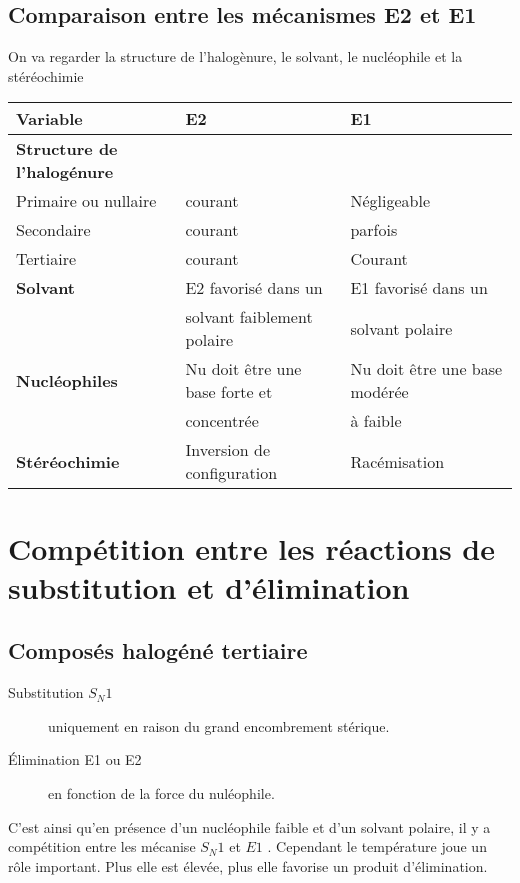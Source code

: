 \subsection{ Comparaison entre les mécanismes E2 et E1}

On va regarder la structure de l'halogènure, le solvant, le nucléophile et la stéréochimie


\begin{tabular}{|l|l|l|}
  \hline
  Variable & E2 &  E1 \\
  \hline
  \textbf{Structure de l'halogénure} & & \\
  Primaire ou nullaire & courant & Négligeable\\
  Secondaire & courant & parfois  \\
  Tertiaire & courant & Courant \\
  \hline
  \textbf{Solvant} & E2 favorisé dans un & E1 favorisé dans un\\
                   & solvant faiblement polaire & solvant polaire  \\
  \hline
  \textbf{Nucléophiles} & Nu doit être une base forte et 	& Nu doit être une base  modérée\\
                         & concentrée & à faible\\
  \hline
  \textbf{Stéréochimie} & Inversion de configuration & Racémisation \\
  \hline
\end{tabular}


\section{Compétition entre les réactions de substitution  et d'élimination}

\subsection{Composés halogéné tertiaire}
\begin{description}
  \item[Substitution $S_N1$] uniquement en raison du grand encombrement stérique.
  \item[\'Elimination E1 ou E2] en fonction de la force du nuléophile.
\end{description}

C'est ainsi qu'en présence d'un nucléophile faible et d'un solvant polaire, il y a compétition entre les mécanise $S_N1$ et $E1$ .
Cependant le température joue un rôle important.
Plus elle est élevée, plus elle favorise un produit d'élimination.

